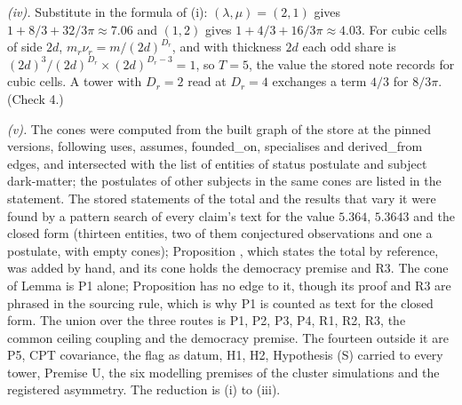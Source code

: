 \emph{(iv).} Substitute in the formula of (i): $(\lambda, \mu) = (2, 1)$ gives $1 + 8/3 + 32/3\pi \approx 7.06$ and $(1, 2)$ gives $1 + 4/3 + 16/3\pi \approx 4.03$. For cubic cells of side $2d$, $m_{r}\nu_{r} = m/(2d)^{D_{r}}$, and with thickness $2d$ each odd share is $(2d)^{3}/(2d)^{D_{r}} \times (2d)^{D_{r}-3} = 1$, so $T = 5$, the value the stored note  records for cubic cells. A tower with $D_{r} = 2$ read at $D_{r} = 4$ exchanges a term $4/3$ for $8/3\pi$. (Check 4.)

\emph{(v).} The cones were computed from the built graph of the store at the pinned versions, following uses, assumes, founded\_on, specialises and derived\_from edges, and intersected with the list of entities of status postulate and subject dark-matter; the postulates of other subjects in the same cones are listed in the statement. The stored statements of the total and the results that vary it were found by a pattern search of every claim's text for the value $5.364$, $5.3643$ and the closed form (thirteen entities, two of them conjectured observations and one a postulate, with empty cones); Proposition , which states the total by reference, was added by hand, and its cone holds the democracy premise and R3. The cone of Lemma  is P1 alone; Proposition  has no edge to it, though its proof and R3 are phrased in the sourcing rule, which is why P1 is counted as text for the closed form. The union over the three routes is P1, P2, P3, P4, R1, R2, R3, the common ceiling coupling and the democracy premise. The fourteen outside it are P5, CPT covariance, the flag as datum, H1, H2, Hypothesis (S) carried to every tower, Premise U, the six modelling premises of the cluster simulations and the registered asymmetry. The reduction is (i) to (iii).
